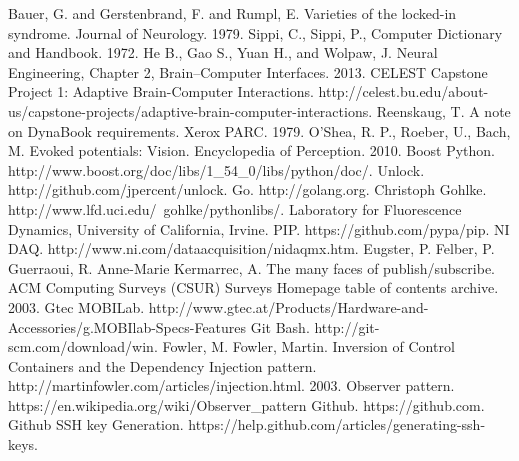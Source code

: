 \documentclass[11pt]{article}
\begin{document}
\begin{thebibliography}{99}
  Bauer, G. and Gerstenbrand, F. and Rumpl, E. Varieties of the locked-in syndrome. Journal of Neurology.  1979.
  Sippi, C.,  Sippi, P., Computer Dictionary and Handbook. 1972. 
  He B., Gao S., Yuan H., and Wolpaw, J.  Neural Engineering, Chapter 2, Brain–Computer Interfaces.  2013.
 CELEST Capstone Project 1: Adaptive Brain-Computer Interactions.  http://celest.bu.edu/about-us/capstone-projects/adaptive-brain-computer-interactions.
  Reenskaug, T. A note on DynaBook requirements. Xerox PARC.  1979.
 O’Shea, R. P., Roeber, U., Bach, M. Evoked potentials: Vision.  Encyclopedia of Perception. 2010.
 Boost Python.  http://www.boost.org/doc/libs/1\_54\_0/libs/python/doc/.
 Unlock.  http://github.com/jpercent/unlock.
 Go.  http://golang.org.
  Christoph Gohlke.  http://www.lfd.uci.edu/~gohlke/pythonlibs/.  Laboratory for Fluorescence Dynamics, University of California, Irvine.
 PIP.  https://github.com/pypa/pip.
 NI DAQ.  http://www.ni.com/dataacquisition/nidaqmx.htm.
 Eugster, P.  Felber, P.  Guerraoui, R.  Anne-Marie Kermarrec, A.  The many faces of publish/subscribe.  ACM Computing Surveys (CSUR) Surveys Homepage table of contents archive.  2003.
 Gtec MOBILab.  http://www.gtec.at/Products/Hardware-and-Accessories/g.MOBIlab-Specs-Features
 Git Bash.  http://git-scm.com/download/win.
 Fowler, M.  Fowler, Martin.  Inversion of Control Containers and the Dependency Injection pattern.  http://martinfowler.com/articles/injection.html.  2003.  
 Observer pattern.  https://en.wikipedia.org/wiki/Observer\_pattern
  Github.  https://github.com.
 Github SSH key Generation.  https://help.github.com/articles/generating-ssh-keys.
\end{thebibliography}
\end{document}
